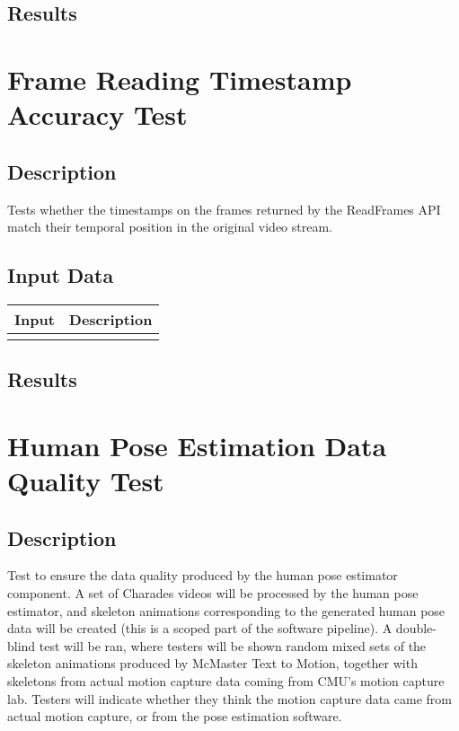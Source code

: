 \documentclass{scrreprt}
\begin{document}
\subsection{Results}

\section{Frame Reading Timestamp Accuracy Test}
\subsection{Description}
\begin{flushleft}
Tests whether the timestamps on the frames returned by the ReadFrames API match their temporal position in the original video stream.
\end{flushleft}
\subsection{Input Data}
 \centering
 \begin{tabular}{p{3cm}p{6cm}}
 \hline\hline
 Input & Description\\
 \hline\hline
   &  \\ %
 \hline
 \end{tabular}
\subsection{Results}

\section{Human Pose Estimation Data Quality Test}
\subsection{Description}
\begin{flushleft}
Test to ensure the data quality produced by the human pose estimator component. A set of Charades videos will be processed by the human pose estimator, and skeleton animations corresponding to the generated human pose data will be created (this is a scoped part of the software pipeline). A double-blind test will be ran, where testers will be shown random mixed sets of the skeleton animations produced by McMaster Text to Motion, together with skeletons from actual motion capture data coming from CMU’s motion capture lab. Testers will indicate whether they think the motion capture data came from actual motion capture, or from the pose estimation software.
\end{flushleft}
\end{document}
